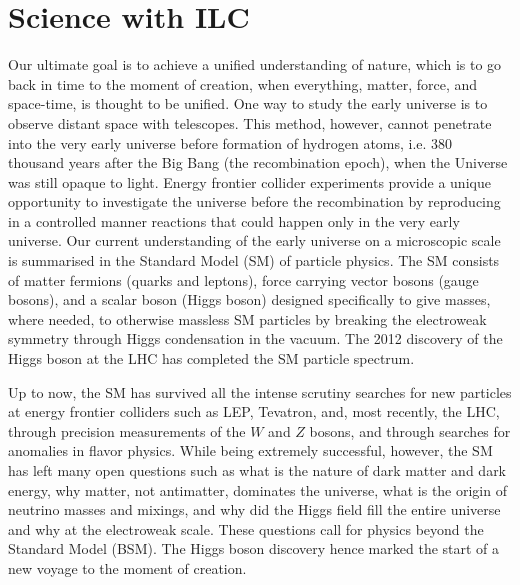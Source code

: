 \chapter{Science with ILC}

Our ultimate goal is to achieve a unified understanding of nature, which is to go back in time to the moment of creation, when everything, matter, force, and space-time, is thought to be unified. One way to study the early universe is to observe distant space with telescopes. This method, however, cannot penetrate into the very early universe before formation of hydrogen atoms, i.e. 380 thousand years after the Big Bang (the recombination epoch), when the Universe was still opaque to light. Energy frontier collider experiments provide a unique opportunity to investigate the universe before the recombination by reproducing in a controlled manner reactions that could happen only in the very early universe. Our current understanding of the early universe on a microscopic scale is summarised in the Standard Model (SM) of particle physics. The SM consists of matter fermions (quarks and leptons), force carrying vector bosons (gauge bosons), and a scalar boson (Higgs boson) designed specifically to give masses, where needed, to otherwise massless SM particles by breaking the electroweak symmetry through Higgs condensation in the vacuum. The 2012 discovery of the Higgs boson at the LHC has completed the SM particle spectrum. 

Up to now, the SM has survived all the intense scrutiny searches for new particles at energy frontier colliders such as LEP, Tevatron, and, most recently, the LHC, through precision measurements of the $W$ and $Z$ bosons, and through searches for anomalies in flavor physics. While being extremely successful, however, the SM has left many open questions such as what is the nature of dark matter and dark energy,  why matter, not antimatter, dominates the universe, what is the origin of neutrino masses and mixings, and why did the Higgs field fill the entire universe and why at the electroweak scale. These questions call for physics beyond the Standard Model (BSM). The Higgs boson discovery hence marked the start of a new voyage to the moment of creation.

